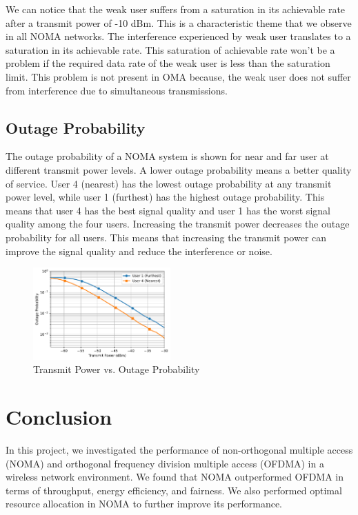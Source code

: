 \documentclass[conference]{IEEEtran}
\begin{document}
We can notice that the weak user suffers from a saturation in its achievable rate after a transmit power of -10 dBm. This is a characteristic theme that we observe in all NOMA networks. The interference experienced by weak user translates to a saturation in its achievable rate. This saturation of achievable rate won't be a problem if the required data rate of the weak user is less than the saturation limit. This problem is not present in OMA because, the weak user does not suffer from interference due to simultaneous transmissions.

\subsection{Outage Probability}
The outage probability of a NOMA system is shown for near and far user at different transmit power levels. A lower outage probability means a better quality of service. User 4 (nearest) has the lowest outage probability at any transmit power level, while user 1 (furthest) has the highest outage probability. This means that user 4 has the best signal quality and user 1 has the worst signal quality among the four users. Increasing the transmit power decreases the outage probability for all users. This means that increasing the transmit power can improve the signal quality and reduce the interference or noise.

\begin{figure}[t!]
    \centering
    \includegraphics[width=0.47\textwidth, height= 0.35\textwidth]{figures/outage_probability.pdf}
    \caption{Transmit Power vs. Outage Probability}
\end{figure}

\section{Conclusion}
In this project, we investigated the performance of non-orthogonal multiple access (NOMA) and orthogonal frequency division multiple access (OFDMA) in a wireless network environment. We found that NOMA outperformed OFDMA in terms of throughput, energy efficiency, and fairness. We also performed optimal resource allocation in NOMA to further improve its performance.
\end{document}
